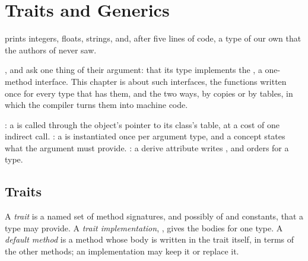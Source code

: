 \chapter{Traits and Generics}\label{ch:b2:rust-traits-and-generics}

 prints integers, floats, strings, and, after five lines of code, a type of our own that the
authors of  never saw.

\label{lst:b2:rust-traits-and-generics:display}

\label{out:b2:rust-traits-and-generics:display}

,  and  ask one thing of their argument: that its type implements the
 , a one-method interface. This chapter is about such interfaces, the functions written once for
every type that has them, and the two ways, by copies or by tables, in which the compiler turns them into machine
code.

\begin{recall}
: a  is called through the object's pointer to its class's table, at a
cost of one indirect call. : a  is instantiated once per argument type, and a
concept states what the argument must provide. : a derive attribute writes
,  and orders for a type.
\end{recall}

\section{Traits}\label{sec:b2:rust-traits-and-generics:traits}

\begin{definition}\label{def:b2:rust-traits-and-generics:trait}
A \emph{trait} is a named set of method signatures, and possibly of  and constants, that
a type may provide. A \emph{trait implementation}, ,
gives the bodies for one type. A \emph{default method} is a method whose body is written in
the trait itself, in terms of the other methods; an implementation may keep it or replace it.
\end{definition}

